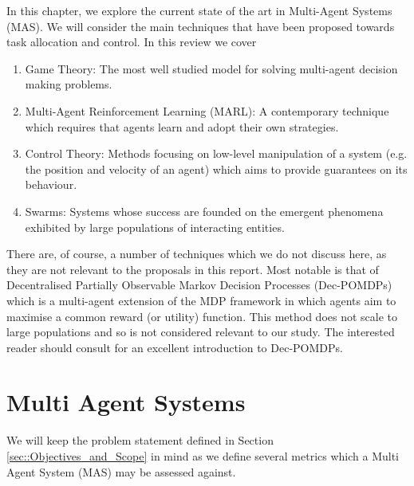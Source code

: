\documentclass[.../main.tex]{subfiles}
\begin{document}
In this chapter, we explore the current state of the art in
Multi-Agent Systems (MAS). We will consider the main techniques that
have been proposed towards task allocation and control. In this review we cover

\begin{enumerate}
    \item Game Theory: The most well studied model for solving multi-agent decision making problems.
    \item Multi-Agent Reinforcement Learning (MARL): A contemporary technique which requires that
    agents learn and adopt their own strategies.
    \item Control Theory: Methods focusing on low-level manipulation of a system (e.g. the position
    and velocity of an agent) which aims to provide guarantees on its behaviour.
    \item Swarms: Systems whose success are founded on the emergent phenomena exhibited by large
    populations of interacting entities.
\end{enumerate}

There are, of course, a number of techniques which we do not discuss here, as they are not relevant
to the proposals in this report. Most notable is that of Decentralised Partially Observable Markov
Decision Processes (Dec-POMDPs) which is a multi-agent extension of the MDP framework in which
agents aim to maximise a common reward (or utility) function. This method does not scale to large
populations and so is not considered relevant to our study. The interested reader should consult
\cite{OliehoekDecentralizedPOMDPs} for an excellent introduction to Dec-POMDPs.

\section{Multi Agent Systems} \label{sec::Multi_Agent_Systems}

We will keep the problem statement defined in Section \ref{sec::Objectives_and_Scope} in mind as
we define several metrics which a Multi Agent System (MAS) may be assessed against.
\end{document}
